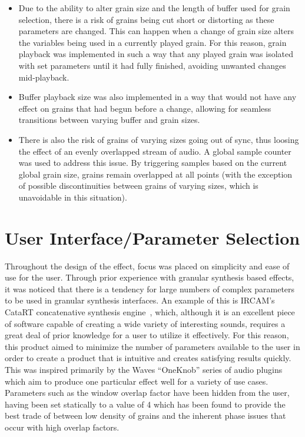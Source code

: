 \documentclass[titlepage]{scrartcl}
\begin{document}
\begin{itemize}
    \item Due to the ability to alter grain size and the length of buffer used
        for grain selection, there is a risk of grains being cut short or
        distorting as these parameters are changed. This can happen when a
        change of grain size alters the variables being used in a currently
        played grain. For this reason, grain playback was implemented in such a
        way that any played grain was isolated with set parameters until it had
        fully finished, avoiding unwanted changes mid-playback.
    \item Buffer playback size was also implemented in a way that would not
        have any effect on grains that had begun before a change, allowing for
        seamless transitions between varying buffer and grain sizes.
    \item There is also the risk of grains of varying sizes going out of sync,
        thus loosing the effect of an evenly overlapped stream of audio. A
        global sample counter was used to address this issue. By triggering
        samples based on the current global grain size, grains remain
        overlapped at all points (with the exception of possible
        discontinuities between grains of varying sizes, which is unavoidable
        in this situation).
\end{itemize}

\section{User Interface/Parameter Selection}
Throughout the design of the effect, focus was placed on simplicity and ease of
use for the user. Through prior experience with granular synthesis based
effects, it was noticed that there is a tendency for large numbers of complex
parameters to be used in granular synthesis interfaces. An example of this is IRCAM's CataRT
concatenative synthesis engine~\parencite{Schwarz2006a}, which, although it is
an excellent piece of software capable of creating a wide variety of
interesting sounds, requires a great deal of prior knowledge for a user to
utilize it effectively. For this reason, this product aimed to minimize the
number of parameters available to the user in order to create a product that is
intuitive and creates satisfying results quickly. This was inspired primarily
by the Waves ``OneKnob'' series of audio plugins~\parencite{Waves2017} which
aim to produce one particular effect well for a variety of use cases.\\
Parameters such as the window overlap factor have been hidden from the user,
having been set statically to a value of 4 which has been found to provide the
best trade of between low density of grains and the inherent phase issues that
occur with high overlap factors.
\end{document}
